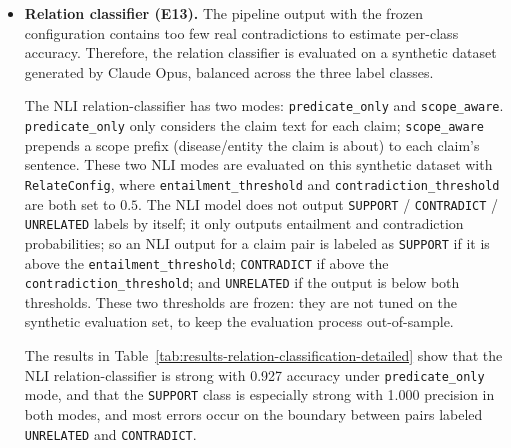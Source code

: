 \begin{itemize}[label={},leftmargin=1.5em]
    Because strict-F1 measures agreement with the Opus labeler rather than source-faithfulness, the pipeline accepts a 6-point decrease in strict-F1 ($0.716 \rightarrow 0.652$) to ensure that every retained claim is supported by the evidence it cites. This trade is deliberately chosen for the clinical knowledge base.

    \item \textbf{Relation classifier (E13).} The pipeline output with the frozen configuration contains too few real contradictions to estimate per-class accuracy. Therefore, the relation classifier is evaluated on a synthetic dataset generated by Claude Opus, balanced across the three label classes.

    The NLI relation-classifier has two modes: \texttt{predicate\_only} and \texttt{scope\_aware}. \texttt{predicate\_only} only considers the claim text for each claim; \texttt{scope\_aware} prepends a scope prefix (disease/entity the claim is about) to each claim's sentence. These two NLI modes are evaluated on this synthetic dataset with \texttt{RelateConfig}, where \texttt{entailment\_threshold} and \texttt{contradiction\_threshold} are both set to $0.5$. The NLI model does not output \texttt{SUPPORT} / \texttt{CONTRADICT} / \texttt{UNRELATED} labels by itself; it only outputs entailment and contradiction probabilities; so an NLI output for a claim pair is labeled as \texttt{SUPPORT} if it is above the \texttt{entailment\_threshold}; \texttt{CONTRADICT} if above the \texttt{contradiction\_threshold}; and \texttt{UNRELATED} if the output is below both thresholds. These two thresholds are frozen: they are not tuned on the synthetic evaluation set, to keep the evaluation process out-of-sample.

    The results in Table~\ref{tab:results-relation-classification-detailed} show that the NLI relation-classifier is strong with 0.927 accuracy under \texttt{predicate\_only} mode, and that the \texttt{SUPPORT} class is especially strong with 1.000 precision in both modes, and most errors occur on the boundary between pairs labeled \texttt{UNRELATED} and \texttt{CONTRADICT}. 


\end{itemize}
